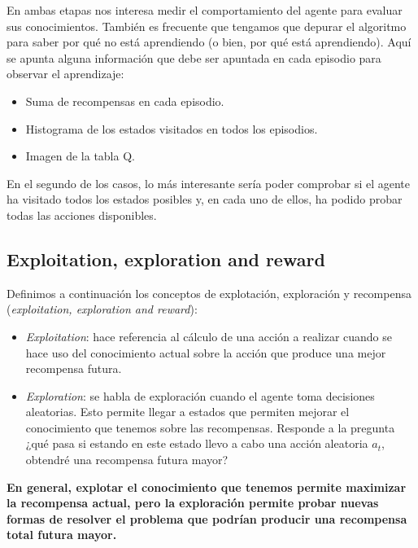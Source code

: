 \documentclass{article}
\begin{document}
 En ambas etapas nos interesa medir el comportamiento del agente para evaluar sus conocimientos. También es frecuente que tengamos que depurar el algoritmo para saber por qué no está aprendiendo (o bien, por qué está aprendiendo). Aquí se apunta alguna información que debe ser apuntada en cada episodio para observar el aprendizaje:
 \begin{itemize}
     \item Suma de recompensas en cada episodio.
     \item Histograma de los estados visitados en todos los episodios.
     \item Imagen de la tabla Q.
 \end{itemize}

En el segundo de los casos, lo más interesante sería poder comprobar si el agente ha visitado todos los estados posibles y, en cada uno de ellos, ha podido probar todas las acciones disponibles.



\subsection{Exploitation, exploration and reward}
Definimos a continuación los conceptos de explotación, exploración y recompensa (\textit{exploitation, exploration and reward}):
\begin{itemize}
    \item \textit{Exploitation}: hace referencia al cálculo de una acción a realizar cuando se hace uso del conocimiento actual sobre la acción que produce una mejor recompensa futura.
    \item \textit{Exploration}: se habla de exploración cuando el agente toma decisiones aleatorias. Esto permite llegar a estados que permiten mejorar el conocimiento que tenemos sobre las recompensas. Responde a la pregunta ¿qué pasa si estando en este estado llevo a cabo una acción aleatoria $a_t$, obtendré una recompensa futura mayor?
\end{itemize}

\textbf{En general, explotar el conocimiento que tenemos permite maximizar la recompensa actual, pero la exploración permite probar nuevas formas de resolver el problema que podrían producir una recompensa total futura mayor.}


\end{document}
